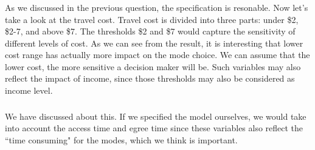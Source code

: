 \documentclass[11pt]{article}
\begin{document}
\subsubsection{} 
As we discussed in the previous question, the specification is resonable. Now let's take a look at the travel cost. Travel cost is divided into three parts: under \$2, \$2-7, and above \$7. The thresholds \$2 and \$7 would capture the sensitivity of different levels of cost. As we can see from the result, it is interesting that lower cost range has actually more impact on the mode choice. We can assume that the lower cost, the more sensitive a decision maker will be. Such variables may also reflect the impact of income, since those thresholds may also be considered as income level.
\subsubsection{}
We have discussed about this. If we specified the model ourselves, we would take into account the access time and egree time since these variables also reflect the ``time consuming" for the modes, which we think is important.
\newpage
\subsection{}
\end{document}
